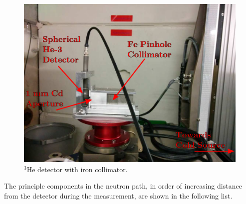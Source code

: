 \documentclass[5p,12pt]{elsarticle}
\begin{document}
\begin{figure}[h!] 
  \centering
    \includegraphics[width=\columnwidth]{graphics/det.eps}
     \caption{$^3$He detector with iron collimator. \label{fig:det}}
\end{figure}

The principle components in the neutron path, in order of increasing distance from the detector during the measurement, are shown in the following list.
\end{document}

